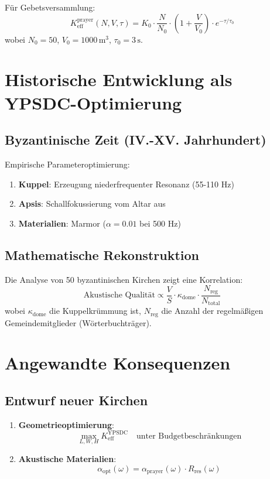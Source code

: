 \documentclass[12pt,a4paper]{article}
\begin{document}
	Für Gebetsversammlung:
	\[
	K_{\mathrm{eff}}^{\mathrm{prayer}}(N, V, \tau) = K_0 \cdot \frac{N}{N_0} \cdot \left(1 + \frac{V}{V_0}\right) \cdot e^{-\tau/\tau_0}
	\]
	wobei $N_0 = 50$, $V_0 = 1000 \, \mathrm{m}^3$, $\tau_0 = 3 \, \mathrm{s}$.
	
	\section{Historische Entwicklung als YPSDC-Optimierung}
	
	\subsection{Byzantinische Zeit (IV.-XV. Jahrhundert)}
	
	Empirische Parameteroptimierung:
	\begin{enumerate}
		\item \textbf{Kuppel}: Erzeugung niederfrequenter Resonanz (55-110 Hz)
		\item \textbf{Apsis}: Schallfokussierung vom Altar aus
		\item \textbf{Materialien}: Marmor ($\alpha = 0.01$ bei 500 Hz)
	\end{enumerate}
	
	\subsection{Mathematische Rekonstruktion}
	
	Die Analyse von 50 byzantinischen Kirchen zeigt eine Korrelation:
	\[
	\text{Akustische Qualität} \propto \frac{V}{S} \cdot \kappa_{\mathrm{dome}} \cdot \frac{N_{\mathrm{reg}}}{N_{\mathrm{total}}}
	\]
	wobei $\kappa_{\mathrm{dome}}$ die Kuppelkrümmung ist, $N_{\mathrm{reg}}$ die Anzahl der regelmäßigen Gemeindemitglieder (Wörterbuchträger).
	
	\section{Angewandte Konsequenzen}
	
	\subsection{Entwurf neuer Kirchen}
	
	\begin{enumerate}
		\item \textbf{Geometrieoptimierung}:
		\[
		\max_{L, W, H} K_{\mathrm{eff}}^{\mathrm{YPSDC}} \quad \text{unter Budgetbeschränkungen}
		\]
		\item \textbf{Akustische Materialien}:
		\[
		\alpha_{\mathrm{opt}}(\omega) = \alpha_{\mathrm{prayer}}(\omega) \cdot R_{\mathrm{res}}(\omega)
		\]
	\end{enumerate}
	
\end{document}

